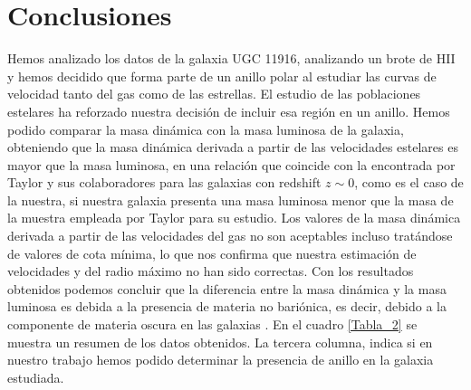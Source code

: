 \documentclass{article}
\begin{document}
\section{Conclusiones}
Hemos analizado los datos de la galaxia UGC 11916, analizando un brote de HII y hemos decidido que forma parte de un anillo polar al estudiar las curvas de velocidad tanto del gas como de las estrellas. El estudio de las poblaciones estelares ha reforzado nuestra decisión de incluir esa región en un anillo.
Hemos podido comparar la masa dinámica con la masa luminosa de la galaxia, obteniendo que la masa dinámica derivada a partir de las velocidades estelares es mayor que la masa luminosa, en una relación que coincide con la encontrada por Taylor y sus colaboradores \cite{Taylor2010} para las galaxias con redshift $z\sim 0$, como es el caso de la nuestra, si nuestra galaxia presenta una masa luminosa menor que la masa de la muestra empleada por Taylor para su estudio. Los valores de la masa dinámica derivada a partir de las velocidades del gas no son aceptables incluso tratándose de valores de cota mínima, lo que nos confirma que nuestra estimación de velocidades y del radio máximo no han sido correctas. Con los resultados obtenidos podemos concluir que la diferencia entre la masa dinámica y la masa luminosa es debida a la presencia de materia no bariónica, es decir, debido a la componente de materia oscura en las galaxias \cite{Padmanabhan2004}. En el cuadro \ref{Tabla_2} se muestra un resumen de los datos obtenidos. La tercera columna, indica si en nuestro trabajo hemos podido determinar la presencia de anillo en la galaxia estudiada.
\begin{table}[H]
\centering
{}
\caption{Valores obtenidos para la galaxia UGC 11916}
\label{Tabla_2}
\end{table}


\end{document}

